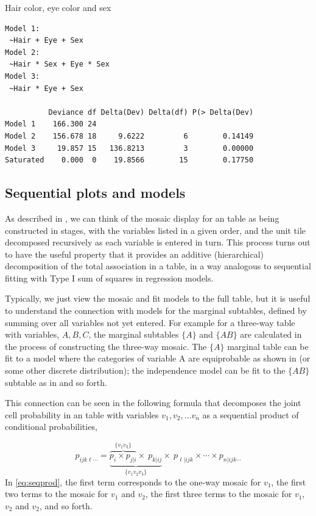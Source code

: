\documentclass[10pt,krantz2]{krantz}\usepackage[]{graphicx}\usepackage[]{color}
\makeatletter
\newenvironment{kframe}{%
 \def\at@end@of@kframe{}%
 \ifinner\ifhmode%
  \def\at@end@of@kframe{\end{minipage}}%
  \begin{minipage}{\columnwidth}%
 \fi\fi%
 \def\FrameCommand##1{\hskip\@totalleftmargin \hskip-\fboxsep
 \colorbox{shadecolor}{##1}\hskip-\fboxsep
     \hskip-\linewidth \hskip-\@totalleftmargin \hskip\columnwidth}%
 \MakeFramed {\advance\hsize-\width
   \@totalleftmargin\z@ \linewidth\hsize
   \@setminipage}}%
 {\par\unskip\endMakeFramed%
 \at@end@of@kframe}
\newenvironment{knitrout}{}{} %
\renewenvironment{knitrout}{\small\renewcommand{\baselinestretch}{.85}}{} %
\makeatother
\begin{document}
\begin{Example}[HEC2]{Hair color, eye color and sex}
\begin{knitrout}
\begin{kframe}
\begin{verbatim}
Model 1:
 ~Hair + Eye + Sex 
Model 2:
 ~Hair * Sex + Eye * Sex 
Model 3:
 ~Hair * Eye + Sex 

          Deviance df Delta(Dev) Delta(df) P(> Delta(Dev)
Model 1    166.300 24                                    
Model 2    156.678 18     9.6222         6        0.14149
Model 3     19.857 15   136.8213         3        0.00000
Saturated    0.000  0    19.8566        15        0.17750
\end{verbatim}
\end{kframe}
\end{knitrout}

\end{Example}

\subsection{Sequential plots and models}\label{sec:mosaic-seq}

As described in ,
we can think of the mosaic display for an \nway table as being constructed in stages,
with the variables listed in a given order, and the unit tile decomposed recursively
as each variable is entered in turn.  This process turns out to have the useful property
that it provides an additive (hierarchical) decomposition of the total association in a table,
in a way analogous to sequential fitting with Type I sum of squares in regression models.

Typically, we just view the mosaic and fit models to the full \nway table, but it is
useful to understand the connection with models for the marginal subtables,
defined by summing over all variables not yet entered.
For example for a three-way table with variables,
$A,B,C$, the marginal subtables $\{A\}$ and $\{AB\}$
are calculated
in the process of constructing the three-way mosaic.
The $\{A\}$ marginal table can be fit to a model where the categories
of variable A are equiprobable as shown in 
(or some other discrete distribution);
the independence model can be fit to the $\{AB\}$ subtable as in 
and so forth.

This connection can be seen in the following formula that decomposes the
joint cell probability in an \nway table with variables $v_1, v_2, \dots v_n$
as a sequential product of conditional
probabilities,

\begin{equation}\label{eq:seqprod}
p_{ijk\ell \cdots} = \underbrace{\overbrace{p_i \times p_{j|i}}^{\{v_1 v_2\}} \times \: p_{k|ij}}_{\{v_1 v_2 v_3\}}
       \times \: p_{\ell|ijk} \times\cdots \times p_{n|ijk\cdots}
\end{equation}
In \eqref{eq:seqprod}, the first term corresponds to the one-way mosaic for $v_1$,
the first two terms to the mosaic for $v_1$ and $v_2$,
the first three terms to the mosaic for $v_1$, $v_2$ and $v_2$, and so forth.
\end{document}
